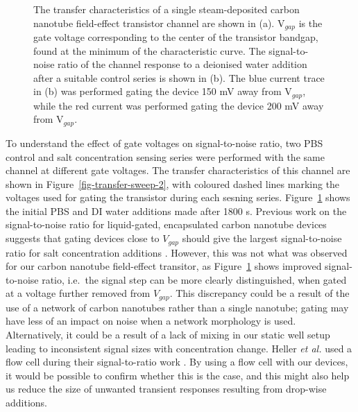 \documentclass[
  a4paper,
]{scrbook}
\begin{document}
\begin{figure}
\begin{minipage}[t]{0.50\linewidth}
{{}

}

\subcaption{\label{fig-salt-conc-SNR}}
\end{minipage}%

\caption{\label{fig-salt-conc-SNR}The transfer characteristics of a
single steam-deposited carbon nanotube field-effect transistor channel
are shown in (a). V\(_{gap}\) is the gate voltage corresponding to the
center of the transistor bandgap, found at the minimum of the
characteristic curve. The signal-to-noise ratio of the channel response
to a deionised water addition after a suitable control series is shown
in (b). The blue current trace in (b) was performed gating the device
150 mV away from V\(_{gap}\), while the red current was performed gating
the device 200 mV away from V\(_{gap}\).}

\end{figure}

To understand the effect of gate voltages on signal-to-noise ratio, two
PBS control and salt concentration sensing series were performed with
the same channel at different gate voltages. The transfer
characteristics of this channel are shown in
Figure~\ref{fig-transfer-sweep-2}, with coloured dashed lines marking
the voltages used for gating the transistor during each sesning series.
Figure~\ref{fig-salt-conc-SNR} shows the initial PBS and DI water
additions made after 1800 s. Previous work on the signal-to-noise ratio
for liquid-gated, encapsulated carbon nanotube devices suggests that
gating devices close to \(V_{gap}\) should give the largest
signal-to-noise ratio for salt concentration additions
\autocite{Heller2009}. However, this was not what was observed for our
carbon nanotube field-effect transitor, as
Figure~\ref{fig-salt-conc-SNR} shows improved signal-to-noise ratio,
i.e.~the signal step can be more clearly distinguished, when gated at a
voltage further removed from \(V_{gap}\). This discrepancy could be a
result of the use of a network of carbon nanotubes rather than a single
nanotube; gating may have less of an impact on noise when a network
morphology is used. Alternatively, it could be a result of a lack of
mixing in our static well setup leading to inconsistent signal sizes
with concentration change. Heller \emph{et al.} used a flow cell during
their signal-to-ratio work \autocite{Heller2009}. By using a flow cell
with our devices, it would be possible to confirm whether this is the
case, and this might also help us reduce the size of unwanted transient
responses resulting from drop-wise additions.
\end{document}
